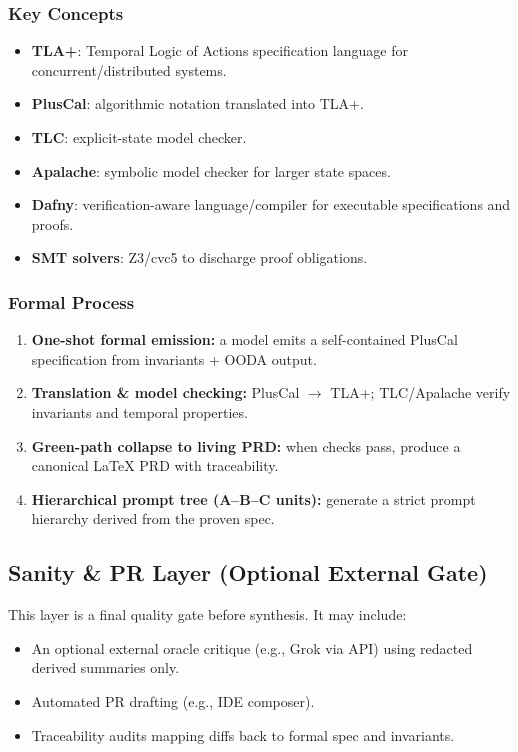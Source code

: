 \documentclass[11pt]{article}
\begin{document}
\subsubsection{Key Concepts}
\begin{itemize}
  \item \textbf{TLA+}: Temporal Logic of Actions specification language for concurrent/distributed systems.
  \item \textbf{PlusCal}: algorithmic notation translated into TLA+.
  \item \textbf{TLC}: explicit-state model checker.
  \item \textbf{Apalache}: symbolic model checker for larger state spaces.
  \item \textbf{Dafny}: verification-aware language/compiler for executable specifications and proofs.
  \item \textbf{SMT solvers}: Z3/cvc5 to discharge proof obligations.
\end{itemize}

\subsubsection{Formal Process}
\begin{enumerate}[leftmargin=2em]
  \item \textbf{One-shot formal emission:} a model emits a self-contained PlusCal specification from invariants + OODA output.
  \item \textbf{Translation \& model checking:} PlusCal $\rightarrow$ TLA+; TLC/Apalache verify invariants and temporal properties.
  \item \textbf{Green-path collapse to living PRD:} when checks pass, produce a canonical \LaTeX{} PRD with traceability.
  \item \textbf{Hierarchical prompt tree (A--B--C units):} generate a strict prompt hierarchy derived from the proven spec.
\end{enumerate}

\subsection{Sanity \& PR Layer (Optional External Gate)}

This layer is a final quality gate before synthesis. It may include:
\begin{itemize}
  \item An optional external oracle critique (e.g., Grok via API) using redacted derived summaries only.
  \item Automated PR drafting (e.g., IDE composer).
  \item Traceability audits mapping diffs back to formal spec and invariants.
\end{itemize}
\end{document}
